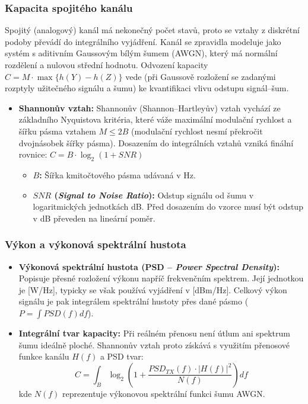     \subsubsection{Kapacita spojitého kanálu}
        Spojitý (analogový) kanál má  nekonečný počet stavů, proto se vztahy z diskrétní podoby převádí do integrálního vyjádření. Kanál se zpravidla modeluje jako systém s aditivním Gaussovým bílým šumem (AWGN), který má normální rozdělení a nulovou střední hodnotu. Odvození kapacity $C = M \cdot \max\{h(Y) - h(Z)\}$ vede (při Gaussově rozložení se zadanými rozptyly užitečného signálu a šumu) ke kvantifikaci vlivu odstupu signál--šum.
        \begin{itemize}
            \item \textbf{Shannonův vztah:} 
            Shannonův (Shannon--Hartleyův) vztah vychází ze základního Nyquistova kritéria, které váže maximální modulační rychlost a šířku pásma vztahem $M \le 2B$ (modulační rychlost nesmí překročit dvojnásobek šířky pásma).
            Dosazením do integrálních vztahů vzniká finální rovnice: $C = B \cdot \log_2(1 + SNR)$
            
            \begin{itemize}
                \item \textbf{$B$:} Šířka kmitočtového pásma udávaná v Hz.
                \item \textbf{$SNR$ (\textit{Signal to Noise Ratio}):} Odstup signálu od šumu v logaritmických jednotkách dB. Před dosazením do vzorce musí být odstup v dB převeden na lineární poměr.
            \end{itemize}
        \end{itemize}
    \subsubsection{Výkon a výkonová spektrální hustota}
        \begin{itemize}
            \item \textbf{Výkonová spektrální hustota (PSD -- \textit{Power Spectral Density}):} Popisuje přesné rozložení výkonu napříč frekvenčním spektrem. Její jednotkou je [W/Hz], typicky se však používá vyjádření v [dBm/Hz]. Celkový výkon signálu je pak integrálem spektrální hustoty přes dané pásmo ($P = \int PSD(f) df$).
            \item \textbf{Integrální tvar kapacity:} Při reálném přenosu není útlum ani spektrum šumu ideálně ploché. Shannonův vztah proto získává s využitím přenosové funkce kanálu $H(f)$ a PSD tvar:
            \[ C = \int_B \log_2 \left( 1 + \frac{PSD_{TX}(f) \cdot |H(f)|^2}{N(f)} \right) df \]
            kde $N(f)$ reprezentuje výkonovou spektrální funkci šumu AWGN.
        \end{itemize}
